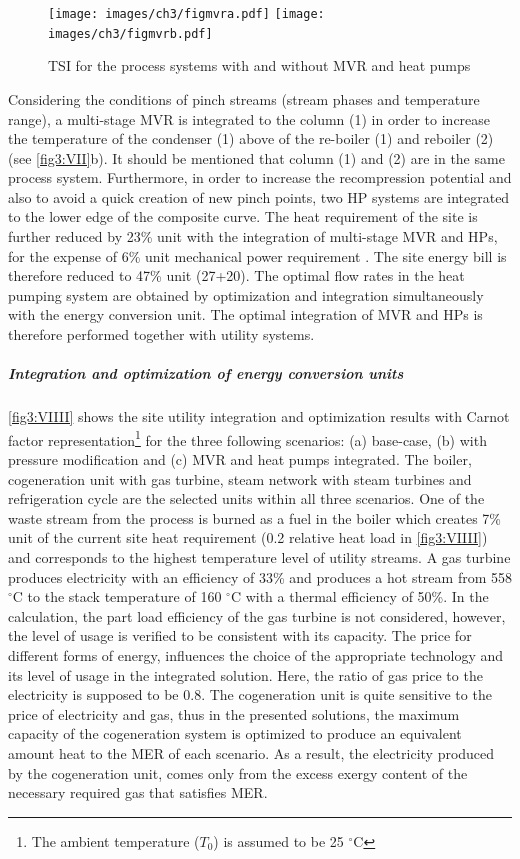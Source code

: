  \begin{figure}[!ht]
\centering
\texttt{[image: images/ch3/figmvra.pdf]}
\texttt{[image: images/ch3/figmvrb.pdf]}
\caption{TSI for the process systems with and without  MVR and heat pumps}
\label{fig3:VIII}
\end{figure}

 Considering the conditions of pinch streams (stream phases and temperature range), a multi-stage MVR is integrated to the column (1) in order to increase the temperature of the condenser (1) above of the re-boiler (1) and reboiler (2) (see \cref{fig3:VII}b). It should be mentioned that column (1) and (2) are in the same process system. Furthermore, in order to increase the recompression potential and also to avoid a quick creation of new pinch points, two HP systems are integrated to the lower edge of the composite curve. The heat requirement of the site is further reduced by 23\% unit with the integration of multi-stage MVR and HPs, for the expense of 6\% unit mechanical power requirement . The site energy bill is therefore reduced to 47\% unit (27+20). The optimal flow rates in the heat pumping system are obtained by optimization and integration simultaneously with the energy conversion unit. The optimal integration of MVR and HPs is therefore performed together with utility systems. 
 
 \subparagraph{Integration and optimization of energy conversion units}

 \cref{fig3:VIIII} shows the site utility integration and optimization results with Carnot factor representation\footnote{The ambient temperature ($T_0$) is assumed to be 25 $^{\circ}\mathrm{C}$ } for the three following scenarios: (a) base-case, (b) with pressure modification and (c) MVR and heat pumps integrated. The boiler, cogeneration unit with gas turbine, steam network with steam turbines and refrigeration cycle are the selected units within all three scenarios. One of the waste stream from the process is burned as a fuel in the boiler which creates 7\% unit of the current site heat requirement (0.2 relative heat load in \cref{fig3:VIIII}) and corresponds to the highest temperature level of utility streams. A gas turbine produces electricity with an efficiency of 33\% and produces a hot stream from 558 $^{\circ}\mathrm{C}$ to the stack temperature of 160 $^{\circ}\mathrm{C}$ with a thermal efficiency of 50\%. In the calculation, the part load efficiency of the gas turbine is not considered, however, the level of usage is verified to be consistent with its capacity. The price for different forms of energy, influences the choice of the appropriate technology and its level of usage in the integrated solution. Here, the ratio of gas price to the electricity is supposed to be $0.8$. The cogeneration unit is quite sensitive to the price of electricity and gas, thus in the presented solutions, the maximum capacity of the cogeneration system is optimized to produce an equivalent amount heat to the MER of each scenario. As a result, the electricity produced by the cogeneration unit, comes only from the excess exergy content of the necessary required gas that satisfies MER. 
 
